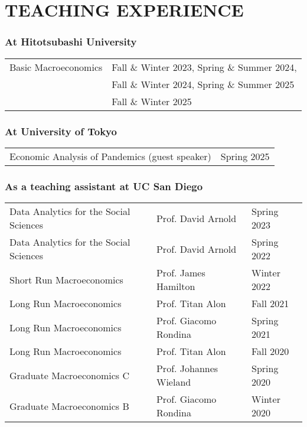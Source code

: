 \documentclass[12pt]{article}
\begin{document}

\section*{TEACHING EXPERIENCE}
\subsubsection*{At Hitotsubashi University}
\begin{tabular}{@{}ll}
Basic Macroeconomics&Fall \& Winter 2023, Spring \& Summer 2024, \\
                    &Fall \& Winter 2024, Spring \& Summer 2025\\
                    &Fall \& Winter 2025\\
\end{tabular}

\subsubsection*{At University of Tokyo}
\begin{tabular}{@{}ll}
Economic Analysis of Pandemics (guest speaker)&Spring 2025
\end{tabular}

\subsubsection*{As a teaching assistant at UC San Diego}
\begin{tabular}{@{}lll}
Data Analytics for the Social Sciences&Prof. David Arnold&Spring 2023\\
Data Analytics for the Social Sciences&Prof. David Arnold&Spring 2022\\
Short Run Macroeconomics&Prof. James Hamilton&Winter 2022\\
Long Run Macroeconomics&Prof. Titan Alon&Fall 2021\\
Long Run Macroeconomics&Prof. Giacomo Rondina&Spring 2021\\
Long Run Macroeconomics&Prof. Titan Alon&Fall 2020\\
Graduate Macroeconomics C&Prof. Johannes Wieland&Spring 2020\\
Graduate Macroeconomics B&Prof. Giacomo Rondina&Winter 2020
\end{tabular}
\end{document}
